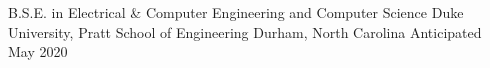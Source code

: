 

\begin{cventries}

  \cventry
    {B.S.E. in Electrical \& Computer Engineering and Computer Science} %
    {Duke University, Pratt School of Engineering} %
    {Durham, North Carolina} %
    {Anticipated May 2020} %
    {}
\end{cventries}
